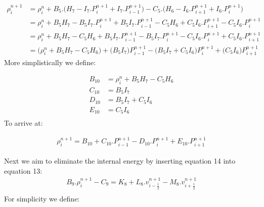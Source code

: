\documentclass[11pt,letterpaper,titlepage]{article}
\newcommand{\half}{\frac{1}{2}}
\begin{document}
\begin{equation*}
\begin{aligned}
\rho_i^{n+1}&=\rho_i^{n}+B_5.\biggr( H_7-I_7.P_{i}^{n+1}+I_7.P_{i-1}^{n+1} \biggr)- C_5.\biggr(H_6-I_6.P_{i+1}^{n+1}+I_6.P_{i}^{n+1} \biggr) \\
&=\rho_i^n + B_5 H_7 - B_5 I_7 . P_{i}^{n+1} + B_5 I_7 . P_{i-1}^{n+1} - C_5 H_6 + C_5 I_6.P_{i+1}^{n+1} - C_5 I_6.P_{i}^{n+1} \\
&=\rho_i^n + B_5 H_7 - C_5 H_6 + B_5 I_7 . P_{i-1}^{n+1} - B_5 I_7 . P_{i}^{n+1} - C_5 I_6.P_{i}^{n+1} + C_5 I_6.P_{i+1}^{n+1} \\
&=\biggr( \rho_i^n + B_5 H_7 - C_5 H_6  \biggr) + \biggr( B_5 I_7 \biggr) P_{i-1}^{n+1} - \biggr(B_5 I_7 + C_5 I_6    \biggr) P_{i}^{n+1}+ \biggr(  C_5 I_6  \biggr) P_{i+1}^{n+1}
\end{aligned}
\end{equation*}
\newline
More simplistically we define:

\begin{equation*}
\begin{aligned}
B_{10} &=  \rho_i^n + B_5 H_7 - C_5 H_6 \\
C_{10} &=   B_5 I_7 \\
D_{10} &=  B_5 I_7 + C_5 I_6  \\
E_{10} &=  C_5 I_6 \\
\end{aligned}
\end{equation*}
\newline
To arrive at:

\begin{equation}
\begin{aligned}
\rho_i^{n+1}=B_{10} + C_{10}. P_{i-1}^{n+1} - D_{10}. P_{i}^{n+1}+ E_{10}. P_{i+1}^{n+1}
\end{aligned}
\end{equation}
\newline




\newpage
Next we aim to eliminate the internal energy by inserting equation 14 into equation 13:
\begin{equation*}
\begin{aligned}
B_9.\rho_{i}^{n+1}-C_9= K_8+L_8.v_{i-\half}^{n+1}-M_8.v_{i+\half}^{n+1}\\
\end{aligned}
\end{equation*}
\newline
For simplicity we define:
\end{document}
